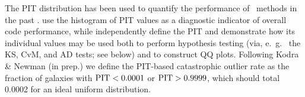 The PIT distribution has been used to quantify the performance of \pzpdf\ methods in the past \citep[e.~g.~][]{bordoloi_photo-z_2010,polsterer_uncertain_2016,tanaka_photometric_2018}.
\citet{tanaka_photometric_2018} use the histogram of PIT values as a diagnostic indicator of overall code performance, while \citet{freeman_unified_2017} independently define the PIT and demonstrate how its individual values may be used both to perform hypothesis testing (via, e.~g.~ the KS, CvM, and AD tests; see below) and to construct QQ plots.
Following Kodra \& Newman (in prep.) we define the PIT-based catastrophic outlier rate as the fraction of galaxies with $\rm{PIT} < 0.0001$ or $\rm{PIT} > 0.9999$, which should total 0.0002 for an ideal uniform distribution.



